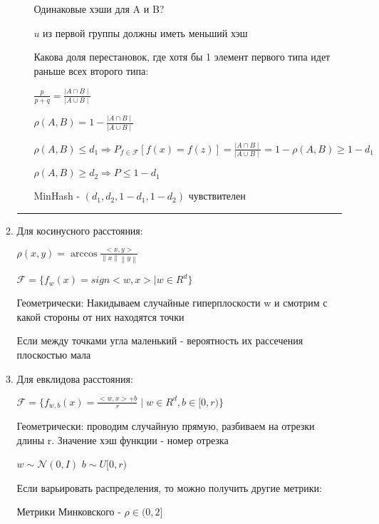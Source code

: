\documentclass[a4paper, 12pt]{article}
\newcommand\norm[1]{\left\lVert#1\right\rVert}
\begin{document}
\begin{enumerate}
\begin{enumerate}
\begin{enumerate}
            Одинаковые хэши для A и B?

            $u$ из первой группы должны иметь меньший хэш

            Какова доля перестановок, где хотя бы 1 элемент
            первого типа идет раньше всех второго типа:

            $\frac{p}{p + q} = 
            \frac{\mid A \cap B \mid}{\mid A \cup B \mid}$

            $\rho(A, B) = 1 - \frac{\mid A \cap B \mid}
            {\mid A \cup B \mid}$

            $\rho(A, B) \leq d_1 \Rightarrow 
            P_{f \in \mathcal{F}}[f(x) = f(z)] =  \frac{\mid A \cap B \mid}
            {\mid A \cup B \mid} = 1 - \rho(A, B) \geq 1 - d_1$

            $\rho(A, B) \geq d_2 \Rightarrow P \leq 1 - d_1$

            MinHash - $(d_1, d_2, 1 - d_1, 1 - d_2)$ чувствителен

        \end{enumerate}

        \rule{\linewidth}{0.5pt}

        \item Для косинусного расстояния:
        
        \(\rho(x, y) = \arccos \frac{<x, y>}{\norm{x}\norm{y}}\)

        \(\mathcal{F} = \{f_w(x) = sign<w, x> \mid w \in R^d\}\)

        Геометрически: 
        Накидываем случайные гиперплоскости w и смотрим с какой
        стороны от них находятся точки

        Если между точками угла маленький - вероятность их 
        рассечения плоскостью мала

        \item Для евклидова расстояния:
        
        \(\mathcal{F} = \{f_{w, b}(x) = \frac{<w, x> + b}{r} 
        \mid w \in R^d, b \in [0, r)\}\)

        Геометрически: проводим случайную прямую,
        разбиваем на отрезки длины r. Значение хэш функции -
        номер отрезка

        \(w \sim \mathcal{N}(0, I)\)
        \(b \sim U[0, r)\)

        Если варьировать распределения, то можно получить
        другие метрики:

        Метрики Минковского - $\rho \in (0, 2]$


\end{enumerate}
\end{enumerate}
\end{document}
